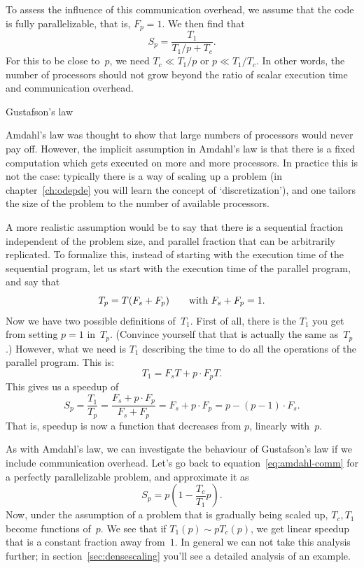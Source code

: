To assess the influence of this communication overhead, we assume that
the code is fully parallelizable, that is, $F_p=1$. We then find that
\begin{equation}
    S_p=\frac{T_1}{T_1/p+T_c}.
    \label{eq:amdahl-comm}
\end{equation}
For this to be close to~$p$, we need $T_c\ll T_1/p$ or $p\ll
T_1/T_c$. In other words, the number of processors should not grow
beyond the ratio of scalar execution time and communication overhead.

 {Gustafson's law}

Amdahl's law was thought to show that large numbers of processors
would never pay off. However, the implicit assumption in Amdahl's law
is that there is a fixed computation which gets executed on more and
more processors. In practice this is not the case: typically there is
a way of scaling up a problem (in chapter~\ref{ch:odepde} you will
learn the concept of `discretization'), and one
tailors the size of the problem to the number of available processors.

A more realistic assumption would be to say that there is a  sequential
fraction independent of the problem size, and parallel fraction that
can be arbitrarily replicated.  To formalize this, instead of starting
with the execution time of the sequential program, let us start with
the execution time of the parallel program, and say that
\[ T_p=T(F_s+F_p) \qquad\hbox{with $F_s+F_p=1$}. \]
Now we have two possible definitions of~$T_1$. First of all, there is the $T_1$ 
you get from setting $p=1$ in~$T_p$. (Convince yourself that that is actually 
the same as~$T_p$.) However, what we need is $T_1$ describing the time
to do all the operations of the parallel program.
This is:
\[ T_1=F_sT+p\cdot F_pT. \]
This gives us a speedup of
\[ S_p=\frac{T_1}{T_p}=\frac{F_s+p\cdot F_p}{F_s+F_p}
   = F_s+p\cdot F_p = p-(p-1)\cdot F_s. 
\]
That is, speedup is now a function that decreases from $p$, linearly
with~$p$.

As with Amdahl's law, we can investigate the behaviour of Gustafson's
law if we include communication overhead. Let's go back to
equation~\eqref{eq:amdahl-comm} for a perfectly parallelizable
problem, and approximate it as
\[ S_p = p(1-\frac{T_c}{T_1}p). \]
Now, under the assumption of a problem that is gradually being scaled up,
$T_c,T_1$ become functions of~$p$. We see that if $T_1(p)\sim pT_c(p)$,
we get linear speedup that is a constant fraction away from~$1$.
In general we can not take this analysis further; in section~\ref{sec:densescaling}
you'll see a detailed analysis of an example. 

